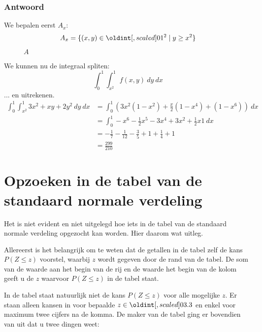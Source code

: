 \documentclass[main.tex]{subfiles}
\begin{document}
\subsubsection*{Antwoord}
We bepalen eerst $A_{x}$:
\[ A_{x} = \{ (x,y) \in \interval{0}{1}^{2} \mid y \ge x^{2} \} \]

\begin{figure}[H]
  \centering
  \caption{$A$}
\end{figure}
\noindent
We kunnen nu de integraal spliten:
\[ \int_{0}^{1} \int_{x^{2}}^{1}f(x,y)\ dy\ dx \]
... en uitrekenen.
\begin{align*}
  \int_{0}^{1} \int_{x^{2}}^{1}3x^{2} + xy + 2y^{2}\ dy\ dx
  &= \int_{0}^{1} \left( 3x^{2}(1-x^{2}) + \frac{x}{2}(1-x^{4}) + (1-x^{6})\right)\ dx\\
  &= \int_{0}^{1}-x^{6}-\frac{1}{2}x^{5}-3x^{4}+3x^{2}+\frac{1}{2}x 1\ dx\\
  &= -\frac{1}{7} - \frac{1}{12} - \frac{3}{5} + 1 + \frac{1}{4} + 1\\
  &=  \frac{299}{210}
\end{align*}


\newpage
\section{Opzoeken in de tabel van de standaard normale verdeling}
Het is niet evident en niet uitgelegd hoe iets in de tabel van de standaard normale verdeling opgezocht kan worden. 
Hier daarom wat uitleg.

Allereerst is het belangrijk om te weten dat de getallen in de tabel zelf de kans $P(Z \le z)$ voorstel, waarbij $z$ wordt gegeven door de rand van de tabel.
De som van de waarde aan het begin van de rij en de waarde het begin van de kolom geeft u de $z$ waarvoor $P(Z \le z)$ in de tabel staat.

In de tabel staat natuurlijk niet de kans $P(Z \le z)$ voor alle mogelijke $z$.
Er staan alleen kansen in voor bepaalde $z \in \interval{0}{3.3}$ en enkel voor maximum twee cijfers na de komma.
De maker van de tabel ging er bovendien van uit dat u twee dingen weet:
\end{document}
